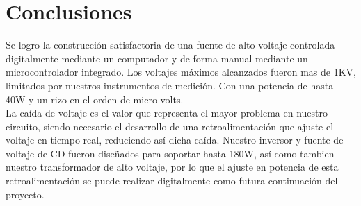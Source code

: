 \chapter{Conclusiones}
Se logro la construcción satisfactoria de una fuente de alto voltaje controlada digitalmente mediante un computador y de forma manual mediante un microcontrolador integrado. Los voltajes máximos alcanzados fueron mas de 1KV, limitados por nuestros instrumentos de medición. Con una potencia de hasta 40W y un rizo en el orden de micro volts.\\

La caída de voltaje es el valor que representa el mayor problema en nuestro circuito, siendo necesario el desarrollo de una retroalimentación que ajuste el voltaje en tiempo real, reduciendo así dicha caída. Nuestro inversor y fuente de voltaje de CD fueron diseñados para soportar hasta 180W, así como tambien nuestro transformador de alto voltaje, por lo que el ajuste en potencia de esta retroalimentación se puede realizar digitalmente como futura continuación del proyecto.